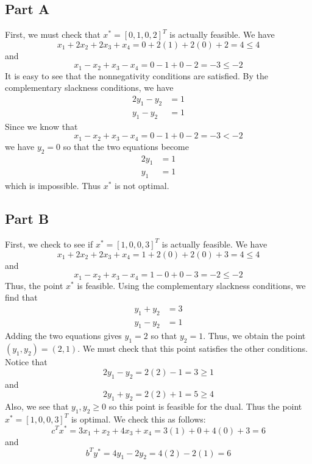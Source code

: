 \documentclass[12pt]{article}
\begin{document}
\subsection*{Part A}
First, we must check that $x^* = [0,1,0,2]^T$ is actually feasible. We have
\[
x_1+ 2x_2 + 2x_3 + x_4 = 0 + 2(1) + 2(0) + 2 = 4 \leq 4
\] and 
\[
x_1 - x_2 + x_3 - x_4 = 0 - 1 + 0 - 2 = -3 \leq -2
\] It is easy to see that the nonnegativity conditions are satisfied.
By the complementary slackness conditions, we have
\begin{align*}
2y_1 - y_2 &= 1\\
y_1 - y_2 &= 1
\end{align*} Since we know that 
\[
x_1 - x_2 + x_3 - x_4 = 0 - 1 + 0 - 2 = -3 < -2
\] we have $y_2 = 0$ so that the two equations become
\begin{align*}
2y_1  &= 1\\
y_1  &= 1
\end{align*} which is impossible. Thus $x^*$ is not optimal.
\subsection*{Part B}
First, we check to see if $x^* = [1,0,0,3]^T$ is actually feasible. We have
\[
x_1 + 2x_2 + 2x_3 + x_4 = 1 + 2(0) + 2(0) + 3 = 4 \leq 4
\] and
\[
x_1-x_2+x_3-x_4 = 1-0+0-3 = -2 \leq -2
\] Thus, the point $x^*$ is feasible. Using the complementary slackness conditions, we find that 
\begin{align*}
y_1 + y_2 &= 3\\
y_1 - y_2 &= 1
\end{align*}
 Adding the two equations gives $y_1 = 2$ so that $y_2 = 1$. Thus, we obtain the point $(y_1,y_2) = (2,1)$. We must check that this point satisfies the other conditions. Notice that
 \[
 2y_1 - y_2  = 2(2) - 1 = 3 \geq 1
 \] and
 \[
 2y_1 + y_2 = 2(2) + 1 = 5 \geq 4
 \] Also, we see that $y_1,y_2 \geq 0$ so this point is feasible for the dual. Thus the point $x^* = [1,0,0,3]^T$ is optimal. We check this as follows:
 \[
 c^T x^* = 3x_1 + x_2 + 4x_3 + x_4 = 3(1) + 0 + 4(0) + 3 = 6
 \] and
 \[
 b^T y^* = 4y_1 - 2y_2 = 4(2) - 2(1) = 6
 \]
\newpage
\end{document}
